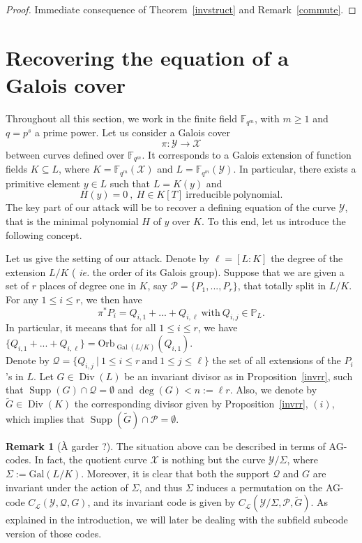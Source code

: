 \documentclass[10pt]{article}
\theoremstyle{definition}
\newtheorem{rq1}[thm]{Remark}
\theoremstyle{definition}
\theoremstyle{definition}
\newcommand{\s}{\vspace{0.3cm}}
\newcommand{\PP}{\mathbb{P}}
\newcommand{\fqm}{\mathbb{F}_{q^m}}
\newcommand{\su}{\subseteq}
\newcommand{\X}{\mathcal{X}}
\newcommand{\Y}{\mathcal{Y}}
\newcommand{\PR}{\mathcal{P}}
\newcommand{\QR}{\mathcal{Q}}
\newcommand{\Div}{\operatorname{Div}}
\newcommand{\Supp}{\operatorname{Supp}}
\newcommand{\Gal}{\operatorname{Gal}}
\newcommand{\calL}{\mathcal{L}}
\begin{document}
\begin{proof}
Immediate consequence of Theorem~\ref{invstruct} and Remark~\ref{commute}.
\end{proof}

\s

\section{Recovering the equation of a Galois cover} \label{sectionfour}


\s

Throughout all this section, we work in the finite field $\fqm$, with $m \geq 1$ and $q=p^s$ a prime power. Let us consider a Galois cover 
\[\pi : \Y \longrightarrow \X\]
between curves defined over $\fqm$. It corresponds to a Galois extension of function fields $K \su L$,
where $K=\fqm(\X)$ and $L=\fqm(\Y)$. In particular, there exists a primitive element $y \in L$ such that $L=K(y)$ and
\[ H(y)=0 \ , \ H \in K[T] \ \mathrm{irreducible \ polynomial.}\]
The key part of our attack will be to recover a defining equation of the curve $\Y$, that is the minimal polynomial $H$ of $y$ over $K$. To this end, let us introduce the following concept.

\s

Let us give the setting of our attack. Denote by $\ell=[L:K]$ the degree of the extension $L/K$ (\color{purple} \textit{ie.} the order of its Galois group\color{black}). Suppose that we are given a set of $r$ places of degree one in $K$, say $\PR = \{P_1,...,P_r\}$, that totally split in $L/K$. For any $1 \leq i \leq r$, we then have
\[\pi^*P_i = Q_{i,1} + ... + Q_{i,\ell} \ \textrm{with}  \ Q_{i,j} \in \PP_L.\]
\color{purple} 
In particular, it meeans that for all $1\leq i\leq r$, we have $\{Q_{i,1} + ... + Q_{i,\ell}\} = \mathrm{Orb}_{\Gal(L/K)}(Q_{i,1})$\color{black}. \\ Denote by $\QR = \{Q_{i,j} \ | \ 1 \leq i \leq r \ \mathrm{and} \ 1 \leq j \leq \ell\}$ the set of all extensions of the $P_i$'s in $L$. 
\color{purple}
Let $G \in \Div(L)$ be an invariant divisor as in Proposition~\ref{invrr}, such that $\Supp(G) \cap \QR = \emptyset$ and $\deg(G) < n:=\ell r$. Also, we denote by $\tilde{G} \in \Div(K)$ the corresponding divisor given by Proposition~\ref{invrr}, $(i)$\color{black}, which implies that $\Supp(\tilde{G}) \cap \PR = \emptyset$. 

\s
\color{purple}
\begin{rq1} [À garder ?]
The situation above can be described in terms of AG-codes. In fact, the quotient curve $\X$ is nothing but the curve $\Y/\Sigma$, where $\Sigma := \mathrm{Gal}(L/K)$. Moreover, it is clear that both the support $\QR$ and $G$ are invariant under the action of $\Sigma$, and thus $\Sigma$ induces a permutation on the AG-code $C_{\calL}(\Y,\QR,G)$, and its invariant code is given by $C_{\calL}(\Y/\Sigma,\PR,\tilde{G})$. As explained in the introduction, we will later be dealing with the subfield subcode version of those codes. 
\end{rq1}
\color{black}
\end{document}
